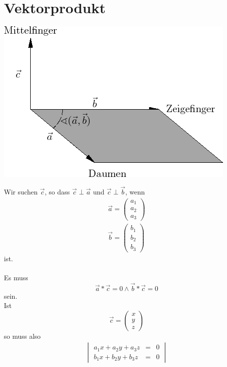 \newpage
\section{Vektorprodukt}
\begin{center}\includegraphics[scale=0.7]{imgs/Vektorprodukt.png}\end{center}
Wir suchen $\vec{c}$, so dass $\vec{c} \perp \vec{a}$ und $\vec{c} \perp \vec{b}$, wenn \\
\begin{eqnarray*}
	\vec{a} = \begin{pmatrix}a_1\\a_2\\a_3\end{pmatrix}\\ 
	\vec{b} = \begin{pmatrix}b_1\\b_2\\b_3\end{pmatrix}
\end{eqnarray*}
ist.\\
\\
Es muss 
\begin{equation*}
	\vec{a}* \vec{c} = 0 \land \vec{b} * \vec{c} = 0
\end{equation*}
sein.\\
Ist 
\begin{equation*}\vec{c} = \begin{pmatrix}x\\y\\z\end{pmatrix}\end{equation*}
so muss also
\begin{eqnarray*}
	\begin{vmatrix} a_1x + a_2y + a_3z &=& 0 \\ 
	b_1x+b_2y+b_3z &=& 0 \end{vmatrix}
\end{eqnarray*}
